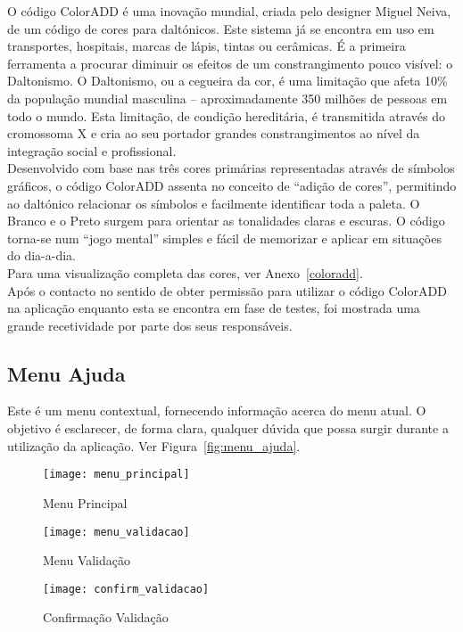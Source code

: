 O código ColorADD é uma inovação mundial, criada pelo designer Miguel Neiva, de um código de cores para daltónicos. Este sistema já se encontra em uso em transportes, hospitais, marcas de lápis, tintas ou cerâmicas. É a primeira ferramenta a procurar diminuir os efeitos de um constrangimento pouco visível: o Daltonismo. O Daltonismo, ou a cegueira da cor, é uma limitação que afeta 10\% da população mundial masculina – aproximadamente 350 milhões de pessoas em todo o mundo. Esta limitação, de condição hereditária, é transmitida através do cromossoma X e cria ao seu portador grandes constrangimentos ao nível da integração social e profissional.
\\Desenvolvido com base nas três cores primárias representadas através de símbolos gráficos, o código ColorADD assenta no conceito de “adição de cores”, permitindo ao daltónico relacionar os símbolos e facilmente identificar toda a paleta. O Branco e o Preto surgem para orientar as tonalidades claras e escuras. O código torna-se num “jogo mental” simples e fácil de memorizar e aplicar em situações do dia-a-dia. \cite{coloradd}
\\Para uma visualização completa das cores, ver Anexo~\ref{coloradd}.
\\Após o contacto no sentido de obter permissão para utilizar o código ColorADD na aplicação enquanto esta se encontra em fase de testes, foi mostrada uma grande recetividade por parte dos seus responsáveis.

\subsection{Menu Ajuda}

Este é um menu contextual, fornecendo informação acerca do menu atual. O objetivo é esclarecer, de forma clara, qualquer dúvida que possa surgir durante a utilização da aplicação. Ver Figura~\ref{fig:menu_ajuda}.

\begin{figure}[t]
  \begin{center}
    \leavevmode
    \texttt{[image: menu\_principal]}
    \caption{Menu Principal}
    \label{fig:menu_principal}
  \end{center}
\end{figure}

\begin{figure}[ht]
\begin{minipage}[b]{0.45\linewidth}
\centering
\texttt{[image: menu\_validacao]}
    \caption{Menu Validação}
    \label{fig:menu_validacao}
\end{minipage}
\hspace{0.5cm}
\begin{minipage}[b]{0.45\linewidth}
\centering
    \texttt{[image: confirm\_validacao]}
    \caption{Confirmação Validação}
    \label{fig:confirm_validacao}
\end{minipage}
\end{figure}

